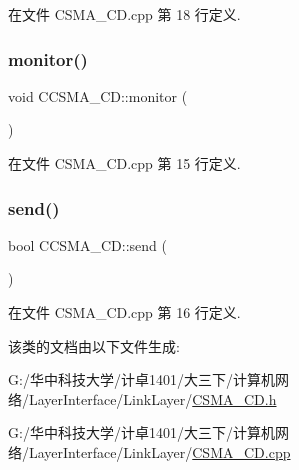 在文件 C\+S\+M\+A\+\_\+\+C\+D.\+cpp 第 18 行定义.

\mbox{\label{class_c_c_s_m_a___c_d_a270a833b070a834dbf2c1f997ea85ee6}} 
\subsubsection{\texorpdfstring{monitor()}{monitor()}}
{\footnotesize\ttfamily void C\+C\+S\+M\+A\+\_\+\+C\+D\+::monitor (\begin{DoxyParamCaption}{ }\end{DoxyParamCaption})}



在文件 C\+S\+M\+A\+\_\+\+C\+D.\+cpp 第 15 行定义.

\mbox{\label{class_c_c_s_m_a___c_d_a630a99c3ee32298d8c217a3fc2e2d65c}} 
\subsubsection{\texorpdfstring{send()}{send()}}
{\footnotesize\ttfamily bool C\+C\+S\+M\+A\+\_\+\+C\+D\+::send (\begin{DoxyParamCaption}{ }\end{DoxyParamCaption})}



在文件 C\+S\+M\+A\+\_\+\+C\+D.\+cpp 第 16 行定义.



该类的文档由以下文件生成\+:\begin{DoxyCompactItemize}
\item 
G\+:/华中科技大学/计卓1401/大三下/计算机网络/\+Layer\+Interface/\+Link\+Layer/\hyperlink{_c_s_m_a___c_d_8h}{C\+S\+M\+A\+\_\+\+C\+D.\+h}\item 
G\+:/华中科技大学/计卓1401/大三下/计算机网络/\+Layer\+Interface/\+Link\+Layer/\hyperlink{_c_s_m_a___c_d_8cpp}{C\+S\+M\+A\+\_\+\+C\+D.\+cpp}\end{DoxyCompactItemize}
